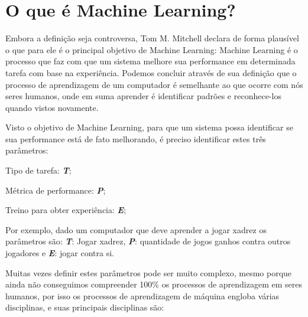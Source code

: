 \section{O que é Machine Learning?}
\label{sec:oqueemachinelearning}

Embora a definição seja controversa, Tom M. Mitchell declara de forma plausível o que para ele é o principal objetivo de Machine Learning: Machine Learning é o processo que faz com que um sistema melhore sua performance em determinada tarefa com base na experiência\cite{Tom}. Podemos concluir através de sua definição que o processo de aprendizagem de um computador é semelhante ao que ocorre com nós seres humanos, onde em suma aprender é identificar padrões e reconhece-los quando vistos novamente.

Visto o objetivo de Machine Learning, para que um sistema possa identificar se sua performance está de fato melhorando, é preciso identificar estes três parâmetros:
 \begin{alineascomponto}
	\item Tipo de tarefa: \textbf{\textit{T}};
	\item Métrica de performance: \textbf{\textit{P}};
	\item Treino para obter experiência: \textbf{\textit{E}};			
\end{alineascomponto}
Por exemplo, dado um computador que deve aprender a jogar xadrez os parâmetros são: \textbf{\textit{T}}: Jogar xadrez, \textbf{\textit{P}}: quantidade de jogos ganhos contra outros jogadores e
\textbf{\textit{E}}: jogar contra si.

Muitas vezes definir estes parâmetros pode ser muito complexo, mesmo porque ainda não conseguimos compreender 100\% os processos
de aprendizagem em seres humanos, por isso os processos de aprendizagem de máquina engloba várias disciplinas, e suas principais disciplinas são: 
 
